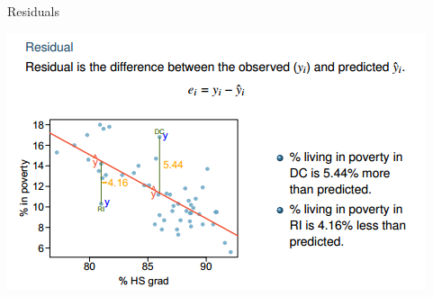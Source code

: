 \documentclass{beamer}
\begin{document}
\begin{frame}{Residuals}
    \begin{center}
        \includegraphics[scale=0.6]{residuals2.png}
    \end{center}
\end{frame}
\end{document}
